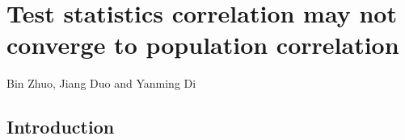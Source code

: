 \section{Test statistics correlation may not converge to population correlation}\label{chap2}
	\vspace*{5cm}
	\begin{centering}
		{\normalsize Bin Zhuo, Jiang Duo and Yanming Di}\\[.04\textheight]
	\end{centering}	
	\vspace*{5cm}

\newpage
	\begin{abstract}
	In this paper, we investigate the relationship between test statistics correlation and 
	population correlation. We are motivated by some research works where a large number of test 
	statistics are pooled together for the purpose of testing multiple genes or gene sets. Among 
	them, some methods are intended to adjust for correlation between test statistics, whose 
	correlation are estimated by sample correlation---a consistent estimator of the population 
	correlation. We show that test statistics correlation may not equal population correlation 
	unless the test statistic takes some specific form. Under bivariate normal assumption, we 
	present the exact formula for test statistics correlation when 
	the statistics are derived from equal-variance two sample $t$-test. Based on the formula,  we 
	prove that test statistics correlation is no more greater in absolute value than population 
	correlation.
	
	\end{abstract}

	\subsection{Introduction}
	
